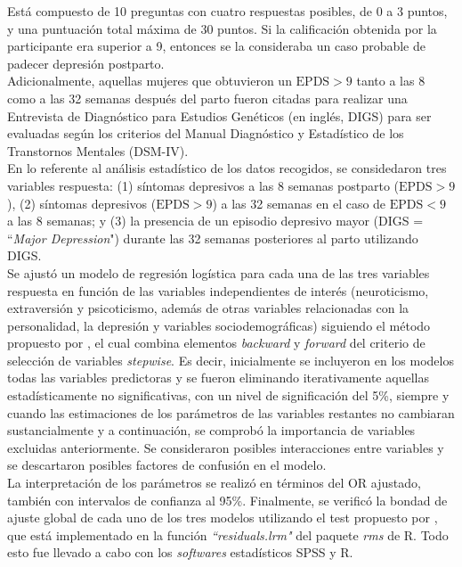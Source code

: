 Está compuesto de 10 preguntas con cuatro respuestas posibles, de 0 a 3 puntos, y una puntuación total máxima de 30 puntos. Si la calificación obtenida por la participante era superior a 9, entonces se la consideraba un caso probable de padecer depresión postparto. \\

Adicionalmente, aquellas mujeres que obtuvieron un $\text{EPDS}>9$ tanto a las 8 como a las 32 semanas después del parto fueron citadas para realizar una Entrevista de Diagnóstico para Estudios Genéticos (en inglés, DIGS) para ser evaluadas según los criterios del Manual Diagnóstico y Estadístico de los Transtornos Mentales (DSM-IV). \\

En lo referente al análisis estadístico de los datos recogidos, se considedaron tres variables respuesta: (1) síntomas depresivos a las 8 semanas postparto ($\text{EPDS}>9$), (2) síntomas depresivos ($\text{EPDS}>9$) a las 32 semanas en el caso de $\text{EPDS}<9$ a las 8 semanas; y (3) la presencia de un episodio depresivo mayor (DIGS = ``\textit{Major Depression}") durante las 32 semanas posteriores al parto utilizando DIGS.\\

Se ajustó un modelo de regresión logística para cada una de las tres variables respuesta en función de las variables independientes de interés (neuroticismo, extraversión y psicoticismo, además de otras variables relacionadas con la personalidad, la depresión y variables sociodemográficas) siguiendo el método propuesto por \textcite{hosmer}, el cual combina elementos \textit{backward} y \textit{forward} del criterio de selección de variables \textit{stepwise}. Es decir, inicialmente se incluyeron en los modelos todas las variables predictoras y se fueron eliminando iterativamente aquellas estadísticamente no significativas, con un nivel de significación del 5\%, siempre y cuando las estimaciones de los parámetros de las variables restantes no cambiaran sustancialmente y a continuación, se comprobó la importancia de variables excluidas anteriormente. Se consideraron posibles interacciones entre variables y se descartaron posibles factores de confusión en el modelo. \\

La interpretación de los parámetros se realizó en términos del OR ajustado, también con intervalos de confianza al 95\%. Finalmente, se verificó la bondad de ajuste global de cada uno de los tres modelos utilizando el test propuesto por \textcite{bondad}, que está implementado en la función \textit{``residuals.lrm"} del paquete \textit{rms} \autocite{rms} de R. Todo esto fue llevado a cabo con los \textit{softwares} estadísticos SPSS y R.
\newpage
